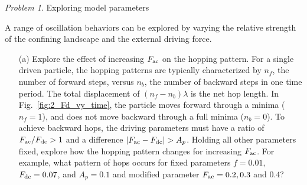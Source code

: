 \documentclass[preprint,showpacs,preprintnumbers,amsmath,amssymb,aps,prb]{revtex4-1}
\theoremstyle{remark}
\newtheorem{problem}{Problem}
\begin{document}
\begin{problem}{Exploring model parameters}
\label{ex:parameters}

\noindent A range of oscillation behaviors
can be explored by varying the
  relative strength of the confining landscape
  and the external driving force.

\begin{enumerate}

\item[(a)]
  Explore the effect of increasing $F_{\rm ac}$ on the hopping pattern.
  For a single driven particle,
  the hopping patterns are typically characterized
  by $n_f$, the number of forward steps,
  versus $n_b$, the number of backward steps  in one
  time period.
  The total displacement of $(n_f - n_b) \lambda$ 
  is the net hop length.  
  In Fig.~\ref{fig:2_Fd_vy_time},
  the particle moves forward through a minima ($n_f = 1$),
  and does not move backward through a full minima ($n_b = 0$).  
  To achieve
  backward hops,
  the driving parameters must have
  a ratio of $F_{\rm ac}/F_{\rm dc} > 1$ 
  and a difference $|F_{\rm ac} - F_{\rm dc}| > A_p$.
  Holding all other parameters fixed,
  explore how the hopping pattern
  changes for increasing $F_{\rm ac}$.
  For example,
  what pattern of hops occurs for
  fixed parameters 
  $f=0.01$, $F_{\rm dc}=0.07$, and $A_p = 0.1$
  and
  modified parameter
  $F_{\rm ac} = 0.2, 0.3$ and $0.4$?
  


\end{enumerate}
\end{problem}
\end{document}
